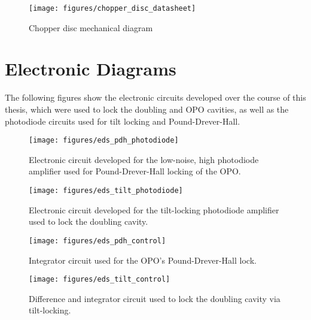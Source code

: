 \begin{sidewaysfigure}
 \centering 
 \texttt{[image: figures/chopper\_disc\_datasheet]} 
 \caption{Chopper disc mechanical diagram} 
 \label{fig:chopper_disc_datasheet} 
\end{sidewaysfigure}

 
\clearpage
\section{Electronic Diagrams}
\label{appendix:electronics_diagrams}

The following figures show the electronic circuits developed over the course of this thesis, which were used to lock the doubling and OPO cavities, as well as the photodiode circuits used for tilt locking and Pound-Drever-Hall.


\clearpage
\begin{figure}[!ht] 
 \centering 
 \texttt{[image: figures/eds\_pdh\_photodiode]} 
 \caption[PDH photodiode circuit]{Electronic circuit developed for the low-noise, high photodiode amplifier used for Pound-Drever-Hall locking of the OPO.} 
 \label{fig:eds_pdh_photo} 
\end{figure}

\clearpage
\begin{figure}[!ht] 
 \centering 
 \texttt{[image: figures/eds\_tilt\_photodiode]} 
 \caption[Tilt Locking photodiode circuit]{Electronic circuit developed for the tilt-locking photodiode amplifier used to lock the doubling cavity.} 
 \label{fig:eds_tilt_photo} 
\end{figure}

\clearpage
\begin{figure}[!ht] 
 \centering 
 \texttt{[image: figures/eds\_pdh\_control]} 
 \caption[PDH integrator circuit]{Integrator circuit used for the OPO's Pound-Drever-Hall lock.} 
 \label{fig:eds_pdh_control} 
\end{figure}

\clearpage
\begin{figure}[!ht] 
 \centering 
 \texttt{[image: figures/eds\_tilt\_control]} 
 \caption[Tilt Locking integrator circuit]{Difference and integrator circuit used to lock the doubling cavity via tilt-locking.} 
 \label{fig:eds_tilt_control} 
\end{figure}

\cleardoublepage
